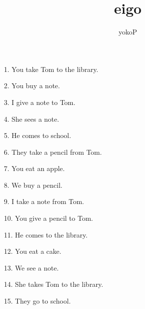 \documentclass[uplatex,
paper=a4,
fontsize=18pt,
jafontsize=16pt,
number_of_lines=30,
line_length=30zh,
baselineskip=25pt,
]{jlreq}
\author{yokoP}
\title{eigo}
\begin{document}
1.  You take Tom to the library.

2.  You buy a note.

3.  I give a note to Tom.

4.  She sees a note.

5.  He comes to school.

6.  They take a pencil from Tom.

7.  You eat an apple.

8.  We buy a pencil.

9.  I take a note from Tom.

10.  You give a pencil to Tom.

11.  He comes to the library.

12.  You eat a cake.

13.  We see a note.

14.  She takes Tom to the library.

15.  They go to school.
\end{document}
